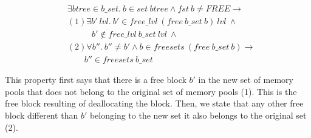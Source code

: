 \begin{lemma} 
\label{lemma:freedealloc}
\end{lemma}
\vspace{-7pt}
\begin{align*}
&\exists btree \in b\_set.\ b \in set\ btree \wedge fst\ b \neq FREE \longrightarrow\\
&(1) \exists b'\ lvl.\ b' \in free\_lvl\ (free\ b\_set\ b)\ lvl\ \wedge\\
&\ \ \ \ \ \ \ \ \ \ \ \ \ b' \notin free\_lvl\ b\_set\ lvl\ \wedge\\
&(2) \forall b''.\ b''\neq b' \wedge b \in freesets\ (free\ b\_set\ b) \longrightarrow\\
&\ \ \ \ \ \ \ \ \ b'' \in freesets\ b\_set
\end{align*}
\vspace{-12pt}

This property first says that there is a free block $b'$ in the new set of memory pools that does not belong to the original set of memory pools (1). This is the free block resulting of deallocating the block. Then, we state that any other free block different than $b'$ belonging to the new set it also belongs to the original set (2).

%


